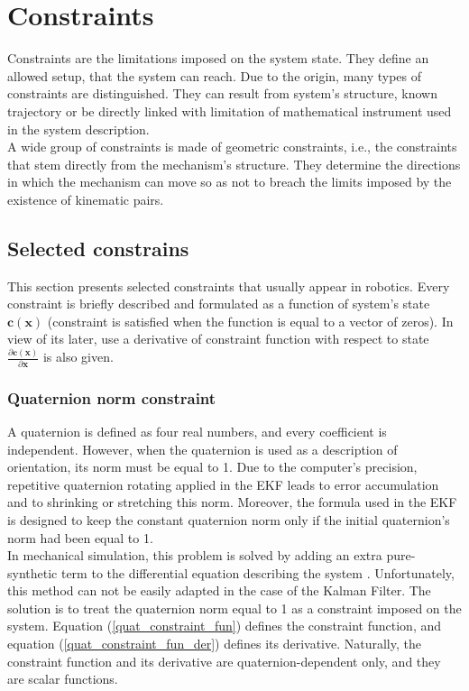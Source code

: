 \chapter{Constraints}

Constraints are the limitations imposed on the system state. They define an allowed setup, that the system can reach. Due to the origin, many types of constraints are distinguished. They can result from system's structure, known trajectory or be directly linked with limitation of mathematical instrument used in the system description.\\

A wide group of constraints is made of geometric constraints, i.e., the constraints that stem directly from the mechanism's structure. They determine the directions in which the mechanism can move so as not to breach the limits imposed by the existence of kinematic pairs.

\section{Selected constrains}

This section presents selected constraints that usually appear in robotics. Every constraint is briefly described and formulated as a function of system's state $\bm{c}(\bm{x})$ (constraint is satisfied when the function is equal to a vector of zeros). In view of its later, use a derivative of constraint function with respect to state $\frac{\partial \bm{c}(\bm{x})}{\partial \bm{x}}$ is also given.

\subsection{Quaternion norm constraint}

A quaternion is defined as four real numbers, and every coefficient is independent. However, when the quaternion is used as a description of orientation, its norm must be equal to 1. Due to the computer's precision, repetitive quaternion rotating applied in the EKF leads to error accumulation and to shrinking or stretching this norm. Moreover, the formula used in the EKF is designed to keep the constant quaternion norm only if the initial quaternion's norm had been equal to 1.\\

In mechanical simulation, this problem is solved by adding an extra pure-synthetic term to the differential equation describing the system \cite{quaternion}. Unfortunately, this method can not be easily adapted in the case of the Kalman Filter. The solution is to treat the quaternion norm equal to 1 as a constraint imposed on the system. Equation (\ref{quat_constraint_fun}) defines the constraint function, and equation (\ref{quat_constraint_fun_der}) defines its derivative. Naturally, the constraint function and its derivative are quaternion-dependent only, and they are scalar functions.

